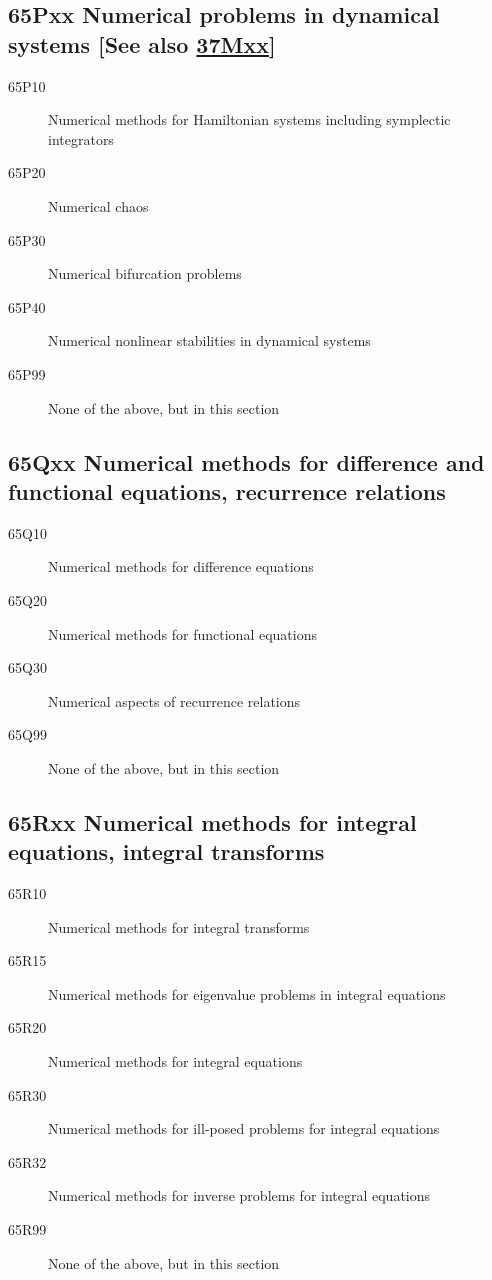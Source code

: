 \subsection*{65Pxx  Numerical problems in dynamical systems [See also \hyperref[37Mxx]{37Mxx}] }\label{65Pxx}
\begin{description}  
\item [65P10]\label{65P10} Numerical methods for Hamiltonian systems including symplectic integrators
\item [65P20]\label{65P20} Numerical chaos
\item [65P30]\label{65P30} Numerical bifurcation problems
\item [65P40]\label{65P40} Numerical nonlinear stabilities in dynamical systems
\item [65P99]\label{65P99} None of the above, but in this section
\end{description}
\subsection*{65Qxx  Numerical methods for difference and functional equations, recurrence relations }\label{65Qxx}
\begin{description}  
\item [65Q10]\label{65Q10} Numerical methods for difference equations
\item [65Q20]\label{65Q20} Numerical methods for functional equations
\item [65Q30]\label{65Q30} Numerical aspects of recurrence relations
\item [65Q99]\label{65Q99} None of the above, but in this section
\end{description}
\subsection*{65Rxx  Numerical methods for integral equations, integral transforms }\label{65Rxx}
\begin{description}  
\item [65R10]\label{65R10} Numerical methods for integral transforms
\item [65R15]\label{65R15} Numerical methods for eigenvalue problems in integral equations
\item [65R20]\label{65R20} Numerical methods for integral equations
\item [65R30]\label{65R30} Numerical methods for ill-posed problems for integral equations
\item [65R32]\label{65R32} Numerical methods for inverse problems for integral equations
\item [65R99]\label{65R99} None of the above, but in this section
\end{description}
